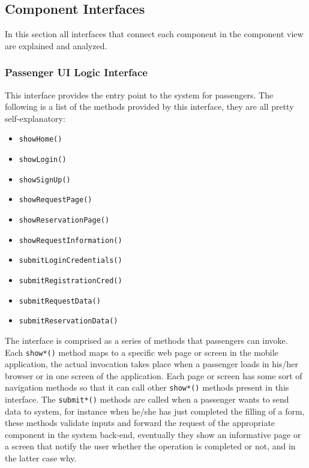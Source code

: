 \subsection{Component Interfaces}
In this section all interfaces that connect each component in the component view are explained and analyzed.
\subsubsection{Passenger UI Logic Interface}
This interface provides the entry point to the system for passengers. \newline
The following is a list of the methods provided by this interface, they are all pretty self-explanatory:
\begin{itemize}
	\item \texttt{showHome()}
	\item \texttt{showLogin()}
	\item \texttt{showSignUp()}
	\item \texttt{showRequestPage()}
	\item \texttt{showReservationPage()}
	\item \texttt{showRequestInformation()}
	\item \texttt{submitLoginCredentials()}
	\item \texttt{submitRegistrationCred()}
	\item \texttt{submitRequestData()}
	\item \texttt{submitReservationData()}
\end{itemize}
The interface is comprised as a series of methods that passengers can invoke. Each \texttt{show*()} method maps to a specific web page or screen in the mobile application, the actual invocation takes place when a passenger loads in his/her browser or in one screen of the application. Each page or screen has some sort of navigation methods so that it can call other \texttt{show*()} methods present in this interface. \newline
The \texttt{submit*()} methods are called when a passenger wants to send data to system, for instance when he/she has just completed the filling of a form, these methods validate inputs and forward the request of the appropriate component in the system back-end, eventually they show an informative page or a screen that notify the user whether the operation is completed or not, and in the latter case why. 
